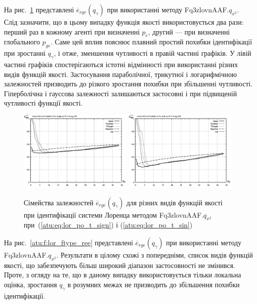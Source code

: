 На рис.~\ref{atu:f:lor_ftype_rge} представлені
$ \overline{e}_{rge} (q_\gamma) $ при використанні методу
Fq3zlovnAAF.$q_{x^2}$.
Слід зазначити, що в цьому випадку функція якості
використовується два рази: перший раз в кожному агенті при
визначенні
$ p_e $, другий --- при визначенні глобального
$ p_{ge} $. Саме цей вплив пояснює плавний простий похибки
ідентифікації при зростанні
$ q_\gamma $, і отже, зменшення чутливості в правій частині графіків. У
лівій частині графіків спостерігаються істотні відмінності
при використанні різних видів функцій якості. Застосування
параболічної, трикутної і логарифмічною залежностей
призводить до різкого зростання похибки при збільшенні
чутливості. Гіперболічна і гауссова залежності залишаються
застосовні і при підвищеній чутливості функції якості.

\begin{figure}[ht!]
  \centerline{
    \includegraphics[width=0.49\textwidth]{p/cha/lor/Fq3zlovnAAF/f_type/lor_Fq3zlovnAAF_qx2_Ft-p_qg_e_all_sign_rge.png}
    \hfill
    \includegraphics[width=0.49\textwidth]{p/cha/lor/Fq3zlovnAAF/f_type/lor_Fq3zlovnAAF_qx2_Ft-p_qg_e_all_sin_rge.png}
  }
\caption{Сімейства залежностей $ \overline{e}_{rge} (q_\gamma) $ для різних видів функцій якості при ідентифікації системи Лоренца методом Fq3zlovnAAF.$q_{x^2} $ при~(\ref{atu:eq:lor_po_t_sign}) і (\ref{atu:eq:lor_po_t_sin})}
\label{atu:f:lor_ftype_rge}
\end{figure}

На рис.~\ref{atu:f:lor_ftype_ree} представлені
$ \overline{e}_{rge} (q_\gamma) $ при використанні методу Fq3zlovnAAF.$q_{x^2} $.
Результати в цілому схожі з попередніми, список
видів функцій якості, що забезпечують більш широкий діапазон
застосовності не змінився. Проте, з огляду на те, що в даному
випадку використовується тільки локальна оцінка, зростання
$ q_\gamma $ в розумних межах не призводить до збільшення похибки
ідентифікації.

